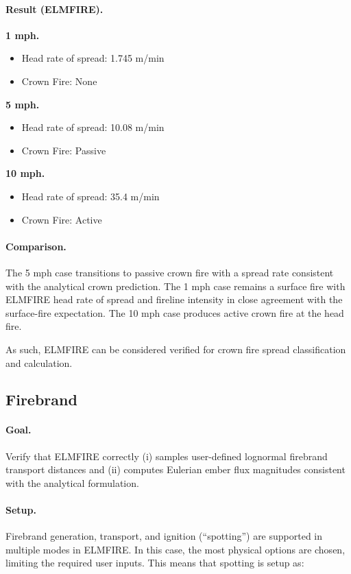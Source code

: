 \paragraph{Result (ELMFIRE).}
\textbf{1 mph.}
\begin{itemize}
    \item Head rate of spread: 1.745 m/min
    \item Crown Fire: None
\end{itemize}

\textbf{5 mph.}
\begin{itemize}
    \item Head rate of spread: 10.08 m/min
    \item Crown Fire: Passive
\end{itemize}

\textbf{10 mph.}
\begin{itemize}
    \item Head rate of spread: 35.4 m/min
    \item Crown Fire: Active
\end{itemize}

\paragraph{Comparison.} The 5 mph case transitions to passive crown fire with a spread rate consistent with the analytical crown prediction. The 1 mph case remains a surface fire with ELMFIRE head rate of spread and fireline intensity in close agreement with the surface-fire expectation. The 10 mph case produces active crown fire at the head fire.

As such, ELMFIRE can be considered verified for crown fire spread classification and calculation.

\clearpage
\subsection{Firebrand}

\paragraph{Goal.} Verify that ELMFIRE correctly (i) samples user-defined lognormal firebrand transport distances and (ii) computes Eulerian ember flux magnitudes consistent with the analytical formulation.

\paragraph{Setup.} Firebrand generation, transport, and ignition (``spotting'') are supported in multiple modes in ELMFIRE. In this case, the most physical options are chosen, limiting the required user inputs. This means that spotting is setup as:

